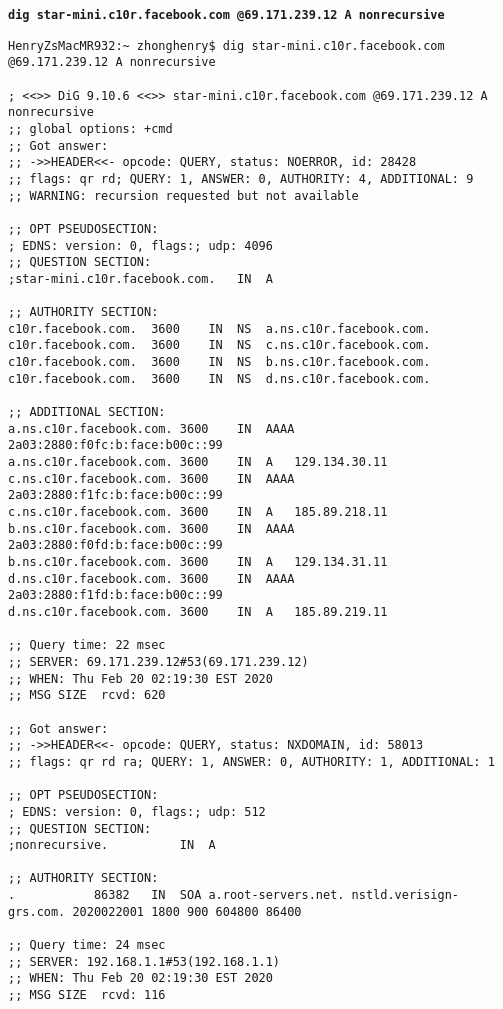 \documentclass[12pt]{article}
\newcommand{\ilc}{\texttt}
\begin{document}
\textbf{\ilc{dig star-mini.c10r.facebook.com @69.171.239.12 A nonrecursive}}
\begin{verbatim}
HenryZsMacMR932:~ zhonghenry$ dig star-mini.c10r.facebook.com @69.171.239.12 A nonrecursive

; <<>> DiG 9.10.6 <<>> star-mini.c10r.facebook.com @69.171.239.12 A nonrecursive
;; global options: +cmd
;; Got answer:
;; ->>HEADER<<- opcode: QUERY, status: NOERROR, id: 28428
;; flags: qr rd; QUERY: 1, ANSWER: 0, AUTHORITY: 4, ADDITIONAL: 9
;; WARNING: recursion requested but not available

;; OPT PSEUDOSECTION:
; EDNS: version: 0, flags:; udp: 4096
;; QUESTION SECTION:
;star-mini.c10r.facebook.com.	IN	A

;; AUTHORITY SECTION:
c10r.facebook.com.	3600	IN	NS	a.ns.c10r.facebook.com.
c10r.facebook.com.	3600	IN	NS	c.ns.c10r.facebook.com.
c10r.facebook.com.	3600	IN	NS	b.ns.c10r.facebook.com.
c10r.facebook.com.	3600	IN	NS	d.ns.c10r.facebook.com.

;; ADDITIONAL SECTION:
a.ns.c10r.facebook.com.	3600	IN	AAAA	2a03:2880:f0fc:b:face:b00c::99
a.ns.c10r.facebook.com.	3600	IN	A	129.134.30.11
c.ns.c10r.facebook.com.	3600	IN	AAAA	2a03:2880:f1fc:b:face:b00c::99
c.ns.c10r.facebook.com.	3600	IN	A	185.89.218.11
b.ns.c10r.facebook.com.	3600	IN	AAAA	2a03:2880:f0fd:b:face:b00c::99
b.ns.c10r.facebook.com.	3600	IN	A	129.134.31.11
d.ns.c10r.facebook.com.	3600	IN	AAAA	2a03:2880:f1fd:b:face:b00c::99
d.ns.c10r.facebook.com.	3600	IN	A	185.89.219.11

;; Query time: 22 msec
;; SERVER: 69.171.239.12#53(69.171.239.12)
;; WHEN: Thu Feb 20 02:19:30 EST 2020
;; MSG SIZE  rcvd: 620

;; Got answer:
;; ->>HEADER<<- opcode: QUERY, status: NXDOMAIN, id: 58013
;; flags: qr rd ra; QUERY: 1, ANSWER: 0, AUTHORITY: 1, ADDITIONAL: 1

;; OPT PSEUDOSECTION:
; EDNS: version: 0, flags:; udp: 512
;; QUESTION SECTION:
;nonrecursive.			IN	A

;; AUTHORITY SECTION:
.			86382	IN	SOA	a.root-servers.net. nstld.verisign-grs.com. 2020022001 1800 900 604800 86400

;; Query time: 24 msec
;; SERVER: 192.168.1.1#53(192.168.1.1)
;; WHEN: Thu Feb 20 02:19:30 EST 2020
;; MSG SIZE  rcvd: 116
\end{verbatim}


\end{document}
